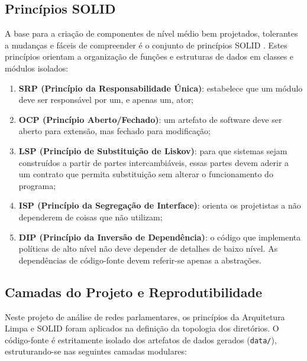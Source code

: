 \documentclass[
      12pt,
      a4paper,
      openright,
      oneside,
      chapter=TITLE,
      section=TITLE,
      english,
      french,
      spanish,
      brazilian
    ]{abntex2}
\begin{document}
    \subsection{Princípios SOLID}
    \label{subsec:solid}
    
    A base para a criação de componentes de nível médio bem projetados, tolerantes a mudanças e fáceis de compreender é o conjunto de princípios SOLID \cite{martin2017}. Estes princípios orientam a organização de funções e estruturas de dados em classes e módulos isolados:
    
    \begin{enumerate}[label=\alph*)]
        \item \textbf{SRP (Princípio da Responsabilidade Única)}: estabelece que um módulo deve ser responsável por um, e apenas um, ator;
        \item \textbf{OCP (Princípio Aberto/Fechado)}: um artefato de software deve ser aberto para extensão, mas fechado para modificação;
        \item \textbf{LSP (Princípio de Substituição de Liskov)}: para que sistemas sejam construídos a partir de partes intercambiáveis, essas partes devem aderir a um contrato que permita substituição sem alterar o funcionamento do programa;
        \item \textbf{ISP (Princípio da Segregação de Interface)}: orienta os projetistas a não dependerem de coisas que não utilizam;
        \item \textbf{DIP (Princípio da Inversão de Dependência)}: o código que implementa políticas de alto nível não deve depender de detalhes de baixo nível. As dependências de código-fonte devem referir-se apenas a abstrações.
    \end{enumerate}
    
    \subsection{Camadas do Projeto e Reprodutibilidade}
    
    Neste projeto de análise de redes parlamentares, os princípios da Arquitetura Limpa e SOLID foram aplicados na definição da topologia dos diretórios. O código-fonte é estritamente isolado dos artefatos de dados gerados (\texttt{data/}), estruturando-se nas seguintes camadas modulares:
    
\end{document}
